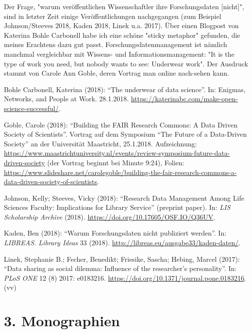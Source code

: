\documentclass[a4paper,
fontsize=11pt,
oneside,
numbers=noperiodatend,
parskip=half-,
bibliography=totoc,
final
]{scrartcl}
\begin{document}
Der Frage, "warum veröffentlichen Wissenschaftler ihre Forschungsdaten
{[}nicht{]}", sind in letzter Zeit einige Veröffentlichungen
nachgegangen (zum Beispiel Johnson/Steeves 2018, Kaden 2018, Linek u.a.
2017). Über einen Blogpost von Katerina Bohle Carbonell habe ich eine
schöne "sticky metaphor" gefunden, die meines Erachtens dazu gut passt.
Forschungsdatenmanagement ist nämlich manchmal vergleichbar mit Wissens-
und Informationsmanagement: "It is the type of work you need, but nobody
wants to see: Underwear work". Der Ausdruck stammt von Carole Ann Goble,
deren Vortrag man online nach-sehen kann.

Bohle Carbonell, Katerina (2018): \enquote{The underwear of data
science}. In: Enigmas, Networks, and People at Work. 28.1.2018.
\url{https://katerinabc.com/make-open-science-successful/}.

Goble, Carole (2018): \enquote{Building the FAIR Research Commons: A
Data Driven Society of Scientists}. Vortrag auf dem Symposium
\enquote{The Future of a Data-Driven Society} an der Universität
Maastricht, 25.1.2018. Aufzeichnung:
\url{https://www.maastrichtuniversity.nl/events/review-symposium-future-data-driven-society}
(der Vortrag beginnt bei Minute 9:24), Folien:
\url{https://www.slideshare.net/carolegoble/building-the-fair-research-commons-a-data-driven-society-of-scientists}.

Johnson, Kelly; Steeves, Vicky (2018): \enquote{Research Data Management
Among Life Sciences Faculty: Implications for Library Service} (preprint
paper). In: \emph{LIS Scholarship Archive} (2018).
\url{https://doi.org/10.17605/OSF.IO/Q36UV}.

Kaden, Ben (2018): \enquote{Warum Forschungsdaten nicht publiziert
werden}. In: \emph{LIBREAS. Library Ideas} 33 (2018).
\url{http://libreas.eu/ausgabe33/kaden-daten/}.

Linek, Stephanie B.; Fecher, Benedikt; Friesike, Sascha; Hebing, Marcel
(2017): \enquote{Data sharing as social dilemma: Influence of the
researcher's personality}. In: \emph{PLoS ONE} 12 (8) 2017: e0183216.
\url{https://doi.org/10.1371/journal.pone.0183216}. (vv)

\hypertarget{monographien}{%
\section{3. Monographien}\label{monographien}}
\end{document}
